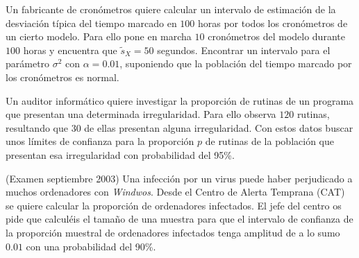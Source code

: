 \documentclass[12pt]{article}\usepackage[]{graphicx}\usepackage[]{color}
\begin{document}
\begin{prob}
Un fabricante de cronómetros quiere calcular un intervalo de estimación de la desviación
típica del tiempo marcado en $100$ horas por todos los cronómetros  de un cierto modelo.
Para ello pone en marcha $10$ cronómetros del modelo durante $100$ horas y encuentra que
$\tilde{s}_{X}=50$ segundos. Encontrar un intervalo para el parámetro $\sigma^2$ con
$\alpha=0.01$, suponiendo que la población del tiempo marcado por los cronómetros es
normal. 
\end{prob}


\begin{prob}
Un auditor informático quiere investigar la proporción de rutinas de un programa que
presentan una determinada irregularidad. Para ello observa $120$ rutinas, resultando que
$30$ de ellas presentan alguna irregularidad. Con estos datos buscar unos límites de
confianza para la proporción $p$ de rutinas de la población que presentan esa irregularidad
con probabilidad del 95\%.

\end{prob}

%
%
\begin{prob}(Examen septiembre 2003) Una infección por un virus puede haber perjudicado a muchos ordenadores con
\emph{Windwos}. Desde el
Centro de Alerta Temprana (CAT) se quiere calcular la
proporción de ordenadores infectados. El jefe del centro  os pide que calculéis
el tamaño de una muestra para que el intervalo de confianza de la proporción muestral de
ordenadores infectados tenga amplitud de a lo sumo $0.01$ con una probabilidad del 90\%.
\end{prob}
\end{document}
